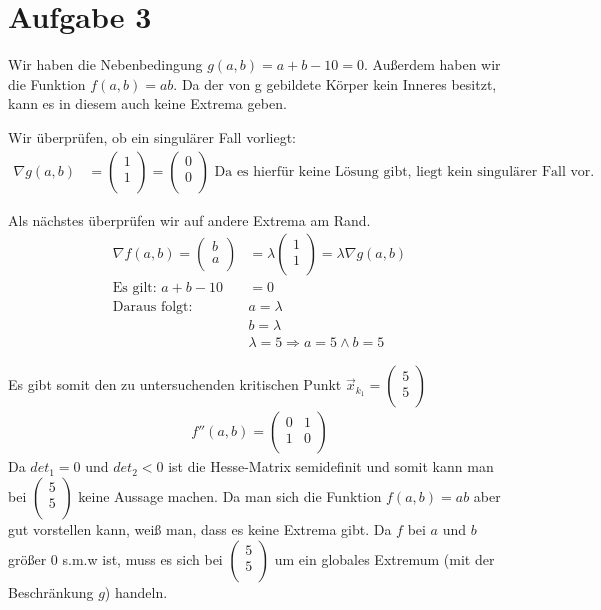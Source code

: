 \documentclass[10pt,a4paper,parskip=half]{scrartcl}
\newcommand{\vectwo}[2]{\begin{pmatrix}#1\\#2\\\end {pmatrix}}
\begin{document}
\section*{Aufgabe 3}
Wir haben die Nebenbedingung $g(a,b) = a + b -10 = 0$. Außerdem haben wir die Funktion $f(a,b) = ab$. Da der von g gebildete Körper kein Inneres besitzt, kann es in diesem auch keine Extrema geben.

Wir überprüfen, ob ein singulärer Fall vorliegt: 
\begin{align*}
\nabla g(a,b) &= \vectwo{1}{1} = \vectwo{0}{0} \text{ Da es hierfür keine Lösung gibt, liegt kein singulärer Fall vor.}
\end{align*}

Als nächstes überprüfen wir auf andere Extrema am Rand.
\begin{align*}
\nabla f(a,b) = \vectwo{b}{a} &= \lambda \vectwo{1}{1} = \lambda \nabla g(a,b) \\
\text{Es gilt: } a + b - 10 &= 0 \\
\text{Daraus folgt: }& a = \lambda \\
& b = \lambda \\
& \lambda = 5 \Rightarrow a = 5 \land b = 5
\end{align*}

Es gibt somit den zu untersuchenden kritischen Punkt $\vec x_{k_1} = \vectwo{5}{5}$
\begin{align*}
f''(a,b) = \begin{pmatrix}
0 & 1 \\
1 & 0 \\
\end{pmatrix}
\end{align*}
Da $det_1 = 0$ und $det_2 < 0$ ist die Hesse-Matrix semidefinit und somit kann man bei $\vectwo{5}{5}$ keine Aussage machen. Da man sich die Funktion $f(a,b) = ab$ aber gut vorstellen kann, weiß man, dass es keine Extrema gibt. 
Da $f$ bei $a$ und $b$ größer 0 s.m.w ist, muss es sich bei $\vectwo{5}{5}$ um ein globales Extremum (mit der Beschränkung $g$) handeln.
\end{document}
